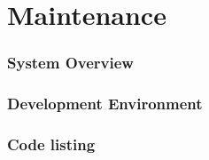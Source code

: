 \part{Maintenance}

\section{System Overview}

\section{Development Environment}

\section{Code listing}



